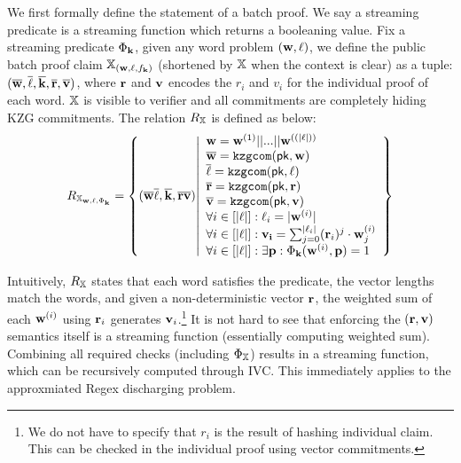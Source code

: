 We first formally define the statement of a batch proof.
We say a streaming predicate is a streaming function which 
returns a booleaning value.
Fix a streaming predicate $\Phi_{{{\mathbf {k}}}}$, 
given any word problem $({{\mathbf {w}}}, {{\mathbf {\ell}}})$,
we define the public batch proof claim 
$\mathbb{X}_{({{\mathbf {w}}}, {{\mathbf {\ell}}}, f_{{\mathbf {k}}})}$
(shortened by $\mathbb{X}$ when the context is clear) 
as a tuple:
$
	(\overline{{{\mathbf {w}}}}, \overline{{{\mathbf {\ell}}}}, \overline{{{\mathbf {k}}}},
		\overline{{{\mathbf {r}}}}, \overline{{{\mathbf {v}}}})
$, where ${{\mathbf {r}}}$ and ${{\mathbf {v}}}$  encodes the
$r_i$ and $v_i$ for the individual proof of each word.
$\mathbb{X}$ is visible to verifier and all commitments are completely
hiding KZG commitments. The relation $R_{\mathbb{X}}$ is defined
as below:
\begin{equation}
	R_{\mathbb{X}_{{{\mathbf {w}}}, {{\mathbf {\ell}}}, \Phi_{{{\mathbf {k}}}}}} = 
	\left\{ 
		(\overline{{{\mathbf {w}}}}
		\overline{{{\mathbf {\ell}}}}, 
		\overline{{{\mathbf {k}}}},
		\overline{{{\mathbf {r}}}}
		\overline{{{\mathbf {v}}}}) \middle\vert
			\begin{array}{l}
				{{\mathbf {w}}} = {{\mathbf {w}}}^{(1)} || ... || 
					{{\mathbf {w}}}^{((|{{\mathbf {\ell}}}|))} \\
				\overline{{{\mathbf {w}}}} = \mathtt{kzgcom}(\mathsf{pk}, {{\mathbf {w}}}) \\
				\overline{{{\mathbf {\ell}}}} = \mathtt{kzgcom}(\mathsf{pk}, {{\mathbf {\ell}}}) \\
				\overline{{{\mathbf {r}}}} = \mathtt{kzgcom}(\mathsf{pk}, {{\mathbf {r}}}) \\
				\overline{{{\mathbf {v}}}} = \mathtt{kzgcom}(\mathsf{pk}, {{\mathbf {v}}}) \\
				\forall i\in [|{{\mathbf {\ell}}}|]: {{\mathbf {\ell}}}_i = |{{\mathbf {w}}}^{(i)}| \\
				\forall i\in [|{{\mathbf {\ell}}}|]: {{\mathbf {v_i}}} = \sum_{j=0}^{|{{\mathbf {\ell}}}_i|}
					({{\mathbf {r}}}_i)^j \cdot {{\mathbf {w}}}^{(i)}_j \\
				\forall i\in [|{{\mathbf {\ell}}}|]: \exists {{\mathbf {p}}}:
					\Phi_{{{\mathbf {k}}}}({{\mathbf {w}}}^{(i)}, {{\mathbf {p}}}) = 1
			\end{array}
	\right\}
\end{equation}

Intuitively, $R_{\mathbb{X}}$ states that each word satisfies
the predicate, the vector lengths match the words,
and given a non-deterministic vector ${{\mathbf {r}}}$, the
weighted sum of each ${{\mathbf {w}}}^{(i)}$ using ${{\mathbf {r}}}_i$
generates ${{\mathbf {v}}}_i$.\footnote{We do not have to
specify that $r_i$ is the result of hashing individual claim.
This can be checked in the individual proof using vector commitments.}
It is not hard to see that enforcing the $({{\mathbf {r}}}, {{\mathbf {v}}})$ semantics
itself is a streaming function (essentially computing weighted sum).
Combining all required checks (including $\Phi_{\mathbb{X}}$) results
in a streaming function, which can be recursively computed through IVC.
This immediately applies to the approxmiated Regex discharging problem.

